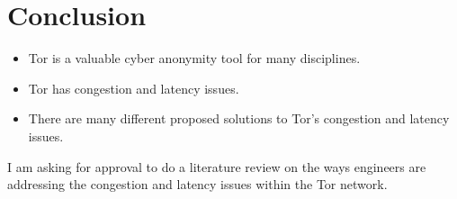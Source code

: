 \documentclass[letterpaper,12pt]{texMemo}
\begin{document}
\section*{Conclusion}
\begin{itemize}
    \item
    Tor is a valuable cyber anonymity tool for many disciplines.
    \item
    Tor has congestion and latency issues.
    \item
    There are many different proposed solutions to Tor's congestion and latency issues.
\end{itemize}
I am asking for approval to do a literature review on the ways engineers are addressing the
congestion and latency issues within the Tor network.



\end{document}

